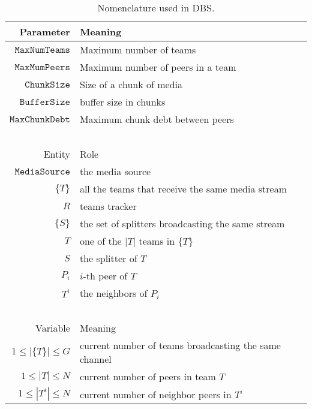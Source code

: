 \label{sec:DBS}

\begin{table}
  \begin{tabular}{rl}
    Parameter & Meaning \\
    \hline
    $\mathtt{MaxNumTeams}$  & Maximum number of teams \\
    $\mathtt{MaxMumPeers}$  & Maximum number of peers in a team \\
    $\mathtt{ChunkSize}$    & Size of a chunk of media \\
    $\mathtt{BufferSize}$   & buffer size in chunks \\
    $\mathtt{MaxChunkDebt}$ & Maximum chunk debt between peers \\
    ~\\
    Entity  & Role \\
    \hline
    $\mathtt{MediaSource}$  & the media source \\
    $\{T\}$ & all the teams that receive the same media stream \\
    $R$     & teams tracker \\
    $\{S\}$ & the set of splitters broadcasting the same stream \\
    $T$     & one of the $|T|$ teams in $\{T\}$ \\
    $S$     & the splitter of $T$ \\
    $P_i$   & $i$-th peer of $T$ \\
    $T^i$   & the neighbors of $P_i$ \\
    ~\\
    Variable            & Meaning \\
    \hline
    $1\leq |\{T\}|\leq G$ & current number of teams broadcasting the same channel \\
    $1\leq |T|\leq N$     & current number of peers in team $T$ \\
    $1\leq |T^i|\leq N$   & current number of neighbor peers in $T^i$ \\
  \end{tabular}
  \caption{Nomenclature used in DBS.\label{tab:DBS_nomenclature}}
\end{table}

